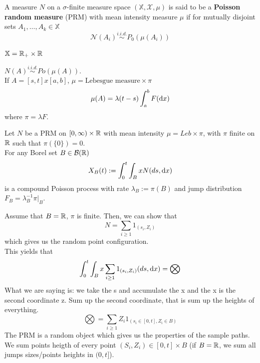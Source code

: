 \documentclass[class=article,crop=false]{standalone}
\begin{document}
\begin{definition}
	A measure $N$ on a $\sigma$-finite measure space $(\mathbb{X}, \mathcal{X}, \mu)$ is said to be a \textbf{Poisson random measure} (PRM) with mean intensity measure $\mu$ if for mutually disjoint sets $A_1,\dots,A_k \in\mathbb{X} $
	$$\mathcal{N}(A_i) \stackrel{i.i.d.} \sim  P_0(\mu(A_i))$$
\end{definition} 
\begin{example}
	$\mathbb{X} = \mathbb{R}_+ \times \mathbb{R}$
	\begin{figure}[H]
		\centering
		
	\end{figure}
	$N(A) \stackrel{i.i.d.} \sim Po(\mu(A))$. \\
	If $A = [s,t] x [a,b] $, $\mu = \text{Lebesgue measure} \times \pi$
	\begin{equation*}
		\mu(A) = \lambda(t-s) \int_a^bF(\mathop{}\!\mathrm{d} x)
	\end{equation*}
	where $\pi = \lambda F$. 
\end{example}
\begin{proposition}
	 Let $N$ be a PRM on $[0,\infty) \times \mathbb{R}$ with mean intensity $\mu=Leb \times \pi$, with $\pi$ finite on $\mathbb{R}$ such that $\pi(\{0\}) = 0$. \\
	For any Borel set $B \in \mathcal{B}(\mathbb{R})$ 
	\begin{equation*}
		X_B(t):= \int_0^t \int_B x N(ds,\mathop{}\!\mathrm{d} x) 
	\end{equation*}
	is a compound Poisson process with rate $\lambda_B:= \pi(B)$ and jump distribution $F_B = \lambda_B^{-1} \pi|_B$. 
\end{proposition}
\begin{example}
	Assume that $B = \mathbb{R}$, $\pi$ is finite. Then, we can show that 
	\begin{equation*}
		N = \sum_{i \geq 1}1_{(s_i,Z_i)}
	\end{equation*}
	which gives us the random point configuration.\\
	This yields that 
	\begin{equation*}
		\int_0^t \int_B x \sum_{i \geq 1}1_{(s_i,Z_i)} (ds,\mathop{}\!\mathrm{d} x) = \bigotimes
	\end{equation*}
	What we are saying is: we take the s and accumulate the x and the x is the second coordinate z. Sum up the second coordinate, that is sum up the heights of everything.
	$$\bigotimes = \sum_{i\geq1} Z_i 1_{(s_i \in [0,t], Z_i \in B)}$$
	The PRM is a random object which gives us the properties of the sample paths.\\
	We sum points heigth of every point $(S_i, Z_i) \in [0,t] \times B$ (if $B = \mathbb{R}$, we sum all jumps sizes/points heights in $(0,t]$). 
\end{example}
\end{document}
